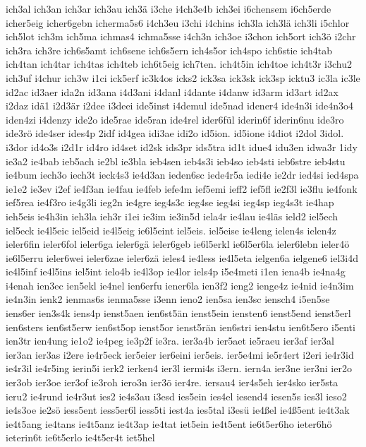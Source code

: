 {ich3al
ich3an
ich3ar
ich3au
ich3ä
i3che
i4ch3e4b
ich3ei
i6chensem
i6ch5erde
icher5eig
icher6gebn
icherma5s6
i4ch3eu
i3chi
i4chins
ich3la
ich3lä
ich3li
i5chlor
ich5lot
ich3m
ich5ma
ichmas4
ichma5sse
i4ch3n
ich3oe
i3chon
ich5ort
ich3ö
i2chr
ich3ra
ich3re
ich6s5amt
ich6sene
ich6s5ern
ich4s5or
ich4spo
ich6stie
ich4tab
ich4tan
ich4tar
ich4tas
ich4teb
ich6t5eig
ich7ten.
ich4t5in
ich4toe
ich4t3r
i3chu2
ich3uf
i4chur
ich3w
i1ci
ick5erf
ic3k4os
icks2
ick3sa
ick3sk
ick3sp
icktu3
ic3la
ic3le
id2ac
id3aer
ida2n
id3ana
i4d3ani
i4danl
i4dante
i4danw
id3arm
id3art
id2ax
i2daz
idä1
i2d3är
i2dee
i3deei
ide5inst
i4demul
ide5nad
idener4
ide4n3i
ide4n3o4
iden4zi
i4denzy
ide2o
ide5rae
ide5ran
ide4rel
ider6fül
iderin6f
iderin6nu
ide3ro
ide3rö
ide4ser
ides4p
2idf
id4gea
idi3ae
idi2o
id5ion.
id5ione
i4diot
i2dol
3idol.
i3dor
id4o3s
i2d1r
id4ro
id4set
id2sk
ids3pr
ids5tra
id1t
idue4
idu3en
idwa3r
1idy
ie3a2
ie4bab
ieb5ach
ie2bl
ie3bla
ieb4sen
ieb4s3i
ieb4so
ieb4sti
ieb6stre
ieb4stu
ie4bum
iech3o
iech3t
ieck4s3
ie4d3an
ieden6sc
iede4r5a
iedi4e
ie2dr
ied4si
ied4spa
ie1e2
ie3ev
i2ef
ie4f3an
ie4fau
ie4feb
iefe4m
ief5emi
ieff2
ief5fl
ie2f3l
ie3flu
ie4fonk
ief5rea
ie4f3ro
ie4g3li
ieg2n
ie4gre
ieg4s3c
ieg4se
ieg4si
ieg4sp
ieg4s3t
ie4hap
ieh5eis
ie4h3in
ieh3la
ieh3r
i1ei
ie3im
ie3in5d
iela4r
ie4lau
ie4läs
ield2
iel5ech
iel5eck
ie4l5eic
iel5eid
ie4l5eig
ie6l5eint
iel5eis.
iel5eise
ie4leng
ielen4s
ielen4z
ieler6fin
ieler6fol
ieler6ga
ieler6gä
ieler6geb
ie6l5erkl
ie6l5er6la
ieler6lebn
ieler4ö
ie6l5erru
ieler6wei
ieler6zae
ieler6zä
ieles4
ie4less
ie4l5eta
ielgen6a
ielgene6
iel3i4d
ie4l5inf
ie4l5ins
iel5int
ielo4b
ie4l3op
ie4lor
iels4p
i5e4meti
i1en
iena4b
ie4na4g
i4enah
ien3ec
ien5ekl
ie4nel
ien6erfu
iener6la
ien3f2
ieng2
ienge4z
ie4nid
ie4n3im
ie4n3in
ienk2
ienmas6s
ienma5sse
i3enn
ieno2
ien5sa
ien3sc
iensch4
i5en5se
iens6er
ien3s4k
iens4p
ienst5aen
ien6st5än
ienst5ein
iensten6
ienst5end
ienst5erl
ien6sters
ien6st5erw
ien6st5op
ienst5or
ienst5rän
ien6stri
ien4stu
ien6t5ero
i5enti
ien3tr
ien4ung
ie1o2
ie4peg
ie3p2f
ie3ra.
ier3a4b
ier5aet
ie5raeu
ier3af
ier3al
ier3an
ier3as
i2ere
ie4r5eck
ier5eier
ier6eini
ier5eis.
ier5e4mi
ie5r4ert
i2eri
ie4r3id
ie4r3il
ie4r5ing
ierin5i
ierk2
ierken4
ier3l
iermi4s
i3ern.
iern4a
ier3ne
ier3ni
ier2o
ier3ob
ier3oe
ier3of
ie3roh
iero3n
ier3ö
ier4re.
iersau4
ier4s5eh
ier4sko
ier5sta
ieru2
ie4rund
ie4r3ut
ies2
ie4s3au
i3esd
ies5ein
ies4el
iesend4
iesen5s
ies3l
ieso2
ie4s3oe
ie2sö
iess5ent
iess5er6l
iess5ti
iest4a
ies5tal
i3esü
ie4ßel
ie4ß5ent
ie4t3ak
ie4t5ang
ie4tans
ie4t5anz
ie4t3ap
ie4tat
iet5ein
ie4t5ent
ie6t5er6ho
ieter6hö
ieterin6t
ie6t5erlo
ie4t5er4t
iet5hel
}
